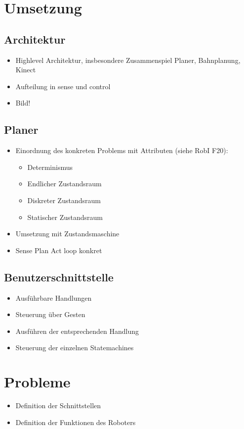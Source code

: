\section{Umsetzung}
\label{umsetzung_integration_sec}

\subsection{Architektur}
\label{integration_architektur_sec}

\begin{itemize}
	\item Highlevel Architektur, insbesondere Zusammenspiel Planer, Bahnplanung, Kinect
	\item Aufteilung in sense und control
	\item Bild!
\end{itemize}

\subsection{Planer}
\label{planer_integration_sec}

\begin{itemize}
	\item Einordnung des konkreten Problems mit Attributen (siehe RobI F20):
	\begin{itemize}
		\item Determinismus
		\item Endlicher Zustandsraum
		\item Diskreter Zustandsraum
		\item Statischer Zustandsraum
	\end{itemize}
	\item Umsetzung mit Zustandsmaschine
	\item Sense Plan Act loop konkret
\end{itemize}

\subsection{Benutzerschnittstelle}
\label{benutzerschnittstelle_integration_cha}

\begin{itemize}
	\item Ausführbare Handlungen
	\item Steuerung über Gesten
	\item Ausführen der entsprechenden Handlung
	\item Steuerung der einzelnen Statemachines
\end{itemize}

\section{Probleme}
\label{probleme_integration_sec}

\begin{itemize}
	\item Definition der Schnittstellen
	\item Definition der Funktionen des Roboters
\end{itemize}
